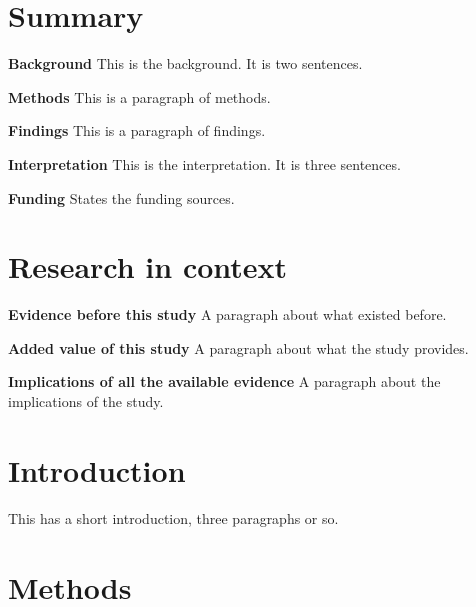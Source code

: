 \documentclass[preprint,12pt]{elsarticle}
\begin{document}
\begin{frontmatter}





\end{frontmatter}



\section{Summary}
\textbf{Background} This is the background. It is two sentences.

\textbf{Methods} This is a paragraph of methods.

\textbf{Findings} This is a paragraph of findings.

\textbf{Interpretation} This is the interpretation. It is three sentences.

\textbf{Funding} States the funding sources.

\section{Research in context}

\textbf{Evidence before this study} 
A paragraph about what existed before.

\textbf{Added value of this study} 
A paragraph about what the study provides.

\textbf{Implications of all the available evidence} 
A paragraph about the implications of the study.

\section{Introduction}
This has a short introduction, three paragraphs or so.

\section{Methods}
\end{document}
